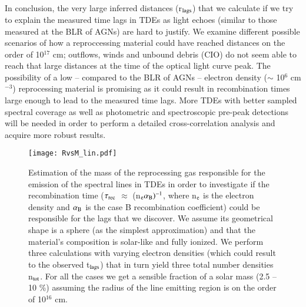 \documentclass[structabstract]{aa}
\begin{document}
In conclusion, the very large inferred distances (r$_{\rm lags}$) that we calculate if we try to explain the measured time lags in TDEs as light echoes (similar to those measured at the BLR of AGNs) are hard to justify. We examine different possible scenarios of how a reproccessing material could have reached distances on the order of 10$^{17}$ cm; outflows, winds and unbound debris (CIO) do not seem able to reach that large distances at the time of the optical light curve peak. The possibility of a low -- compared to the BLR of AGNs -- electron density ($\sim$ 10$^{6}$ cm$^{-3}$) reprocessing material is promising as it could result in recombination times large enough to lead to the measured time lags. More TDEs with better sampled spectral coverage as well as photometric and spectroscopic pre-peak detections will be needed in order to perform a detailed cross-correlation analysis and acquire more robust results.

\begin{figure}
\centering
\texttt{[image: RvsM\_lin.pdf]}
\caption{Estimation of the mass of the reprocessing gas responsible for the emission of the spectral lines in TDEs in order to investigate if the recombination time ($\tau_{\rm rec}$ $\approx$ (n$_{\rm e}\alpha_{\rm B})^{-1}$, where n$_{\rm e}$ is the electron density and $\alpha_{\rm B}$ is the case B recombination coefficient) could be responsible for the lags that we discover. We assume its geometrical shape is a sphere (as the simplest approximation) and that the material's composition is solar-like and fully ionized. We perform three calculations with varying electron densities (which could result to the observed t$_{\rm lags}$) that in turn yield three total number densities n$_{\rm tot}$. For all the cases we get a sensible fraction of a solar mass (2.5 -- 10 \%) assuming the radius of the line emitting region is on the order of 10$^{16}$ cm. }
\label{fig:3_n_tots}
\end{figure}
\end{document}
